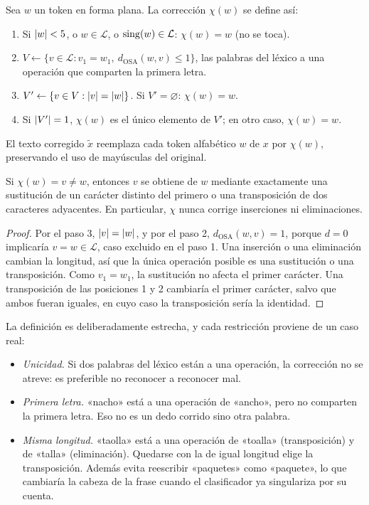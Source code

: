 \begin{definicion}
\label{def:correccion}
Sea $w$ un token en forma plana. La corrección $\chi(w)$ se define así:
\begin{enumerate}
  \item Si $\left\lvert w \right\rvert<5$, o $w\in\mathcal{L}$, o $\operatorname{sing}(w)\in\mathcal{L}$:
        $\chi(w)=w$ (no se toca).
  \item $V\gets\{v\in\mathcal{L} : v_1=w_1,\ d_{\mathrm{OSA}}(w,v)\leq1\}$,
        las palabras del léxico a una operación que comparten la primera letra.
  \item $V'\gets\{v\in V : \left\lvert v \right\rvert=\left\lvert w \right\rvert\}$. Si $V'=\varnothing$:
        $\chi(w)=w$.
  \item Si $\left\lvert V' \right\rvert=1$, $\chi(w)$ es el único elemento de $V'$; en otro caso,
        $\chi(w)=w$.
\end{enumerate}
El texto corregido $\tilde x$ reemplaza cada token alfabético $w$ de $x$ por
$\chi(w)$, preservando el uso de mayúsculas del original.
\end{definicion}

\begin{proposicion}
\label{prop:correccion-clase}
Si $\chi(w)=v\neq w$, entonces $v$ se obtiene de $w$ mediante exactamente una
sustitución de un carácter distinto del primero o una transposición de dos
caracteres adyacentes. En particular, $\chi$ nunca corrige inserciones ni
eliminaciones.
\end{proposicion}

\begin{proof}
Por el paso 3, $\left\lvert v \right\rvert=\left\lvert w \right\rvert$, y por el paso 2,
$d_{\mathrm{OSA}}(w,v)=1$, porque $d=0$ implicaría $v=w\in\mathcal{L}$, caso
excluido en el paso 1. Una inserción o una eliminación cambian la longitud,
así que la única operación posible es una sustitución o una transposición.
Como $v_1=w_1$, la sustitución no afecta el primer carácter. Una
transposición de las posiciones 1 y 2 cambiaría el primer carácter, salvo que
ambos fueran iguales, en cuyo caso la transposición sería la identidad.
\end{proof}

La definición es deliberadamente estrecha, y cada restricción proviene de un
caso real:
\begin{itemize}
  \item \emph{Unicidad.} Si dos palabras del léxico están a una operación, la
        corrección no se atreve: es preferible no reconocer a reconocer mal.
  \item \emph{Primera letra.} «nacho» está a una operación de «ancho», pero no
        comparten la primera letra. Eso no es un dedo corrido sino otra
        palabra.
  \item \emph{Misma longitud.} «taolla» está a una operación de «toalla»
        (transposición) y de «talla» (eliminación). Quedarse con la de igual
        longitud elige la transposición. Además evita reescribir «paquetes»
        como «paquete», lo que cambiaría la cabeza de la frase cuando el
        clasificador ya singulariza por su cuenta.
\end{itemize}

